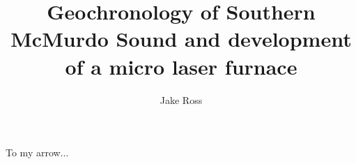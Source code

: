 \documentclass[12pt]{report}
\author{Jake Ross}
\title{Geochronology of Southern McMurdo Sound and development of a micro laser furnace}
\begin{document}
%
%
\begin{dedication}
{To my arrow...}
\end{dedication}
%
%
\titlepage
%
%
\end{document}
